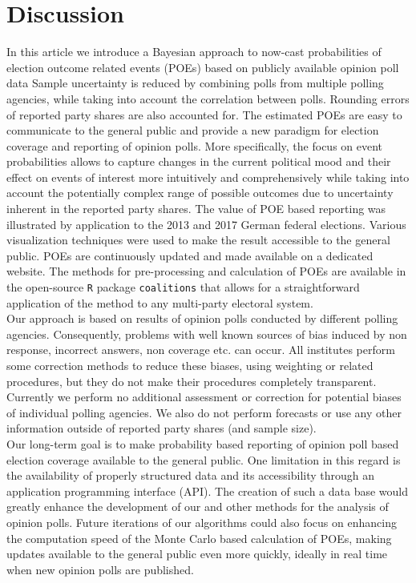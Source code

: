 \documentclass[smallextended]{svjour3}      %
\begin{document}
\section{Discussion} \label{sec:conclusion}
In this article we introduce a Bayesian approach to now-cast probabilities of
election outcome related events (POEs) based on publicly available opinion poll data
Sample uncertainty is reduced by combining polls from multiple polling agencies,
while taking into account the correlation between polls.
Rounding errors of reported party shares are also accounted for.
The estimated POEs are easy to communicate to the general public and provide
a new paradigm for election coverage and reporting of opinion polls.
More specifically, the focus on event probabilities allows to capture
changes in the current political mood and their effect on events of interest more
intuitively and comprehensively while taking into account the potentially complex
range of possible outcomes due to uncertainty inherent in the
reported party shares. The value of POE based reporting was illustrated by
application to the 2013 and 2017 German federal elections.
Various visualization techniques were used to make the result accessible to the
general public. POEs are continuously updated and
made available on a dedicated website. The methods for pre-processing and
calculation of POEs are available in the
open-source \texttt{R} package \texttt{coalitions} that allows for a straightforward
application of the method to any multi-party electoral system.\\

Our approach is based on results of opinion polls conducted by different
polling agencies. Consequently, problems with well known sources of bias induced
by non response, incorrect answers, non coverage etc. can occur. All institutes
perform some correction methods to reduce these biases, using weighting or related
procedures, but they do not make their procedures completely transparent.
Currently we perform no additional assessment or correction for potential biases
of individual polling agencies. We also do not perform forecasts or use
any other information outside of reported party shares (and sample size).\\


Our long-term goal is to make probability based reporting of opinion poll based
election coverage available to the general public. One limitation in this regard
is the availability of properly structured data and its accessibility through
an application programming interface (API). The creation of such a data base
would greatly enhance the development of our and other methods for the analysis
of opinion polls. Future iterations of our algorithms could also focus on
enhancing  the computation speed of the Monte Carlo based calculation of
POEs, making updates available to the general public even more quickly,
ideally in real time when new opinion polls are published.
\end{document}
